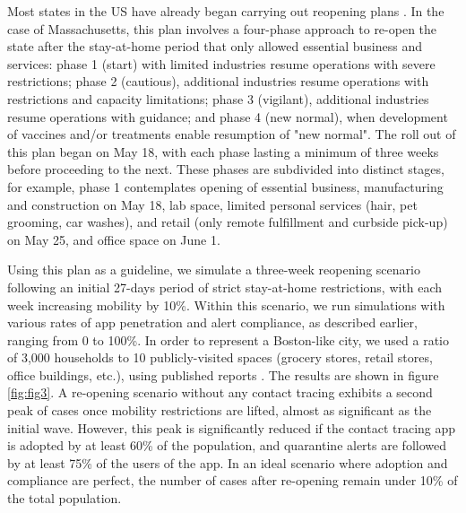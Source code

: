 \documentclass{article}
\begin{document}
Most states in the US have already began carrying out reopening plans \cite{ReopeningUS}. In the case of Massachusetts, this plan involves a four-phase approach to re-open the state after the stay-at-home period that only allowed essential business and services\cite{ReopeningMass}: phase 1 (start) with limited industries resume operations with severe restrictions; phase 2 (cautious), additional industries resume operations with restrictions and capacity limitations; phase 3 (vigilant), additional industries resume operations with guidance; and phase 4 (new normal),  when development of vaccines and/or treatments enable resumption of "new normal". The roll out of this plan began on May 18, with each  phase lasting a minimum of three weeks before proceeding to the next. These phases are subdivided into distinct stages, for example, phase 1 contemplates opening of essential business, manufacturing and construction on May 18, lab space, limited personal services (hair, pet grooming, car washes), and retail (only remote fulfillment and curbside pick-up) on May 25, and office space on June 1. 

Using this plan as a guideline, we simulate a three-week reopening scenario following an initial 27-days period of strict stay-at-home restrictions, with each week increasing mobility by 10\%. Within this scenario, we run simulations with various rates of app penetration and alert compliance, as described earlier, ranging from 0 to 100\%. In order to represent a Boston-like city, we used a ratio of 3,000 households to 10 publicly-visited spaces (grocery stores, retail stores, office buildings, etc.), using published reports \cite{BostonNumbers, BostonMarkets}. The results are shown in figure \ref{fig:fig3}. A re-opening scenario without any contact tracing exhibits a second peak of cases once mobility restrictions are lifted, almost as significant as the initial wave. However, this peak is significantly reduced if the contact tracing app is adopted by at least 60\% of the population, and quarantine alerts are followed by at least 75\% of the users of the app. In an ideal scenario where adoption and compliance are perfect, the number of cases after re-opening remain under 10\% of the total population. 
\end{document}
